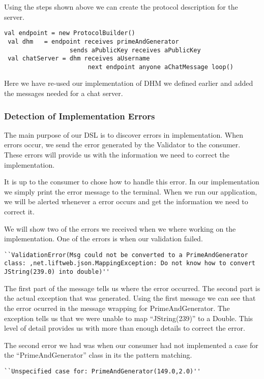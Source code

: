 Using the steps shown above we can create the protocol description for the server. 
\begin{lstlisting}[style=myScalastyle]
 val endpoint = new ProtocolBuilder()
 val dhm   = endpoint receives primeAndGenerator 
                  sends aPublicKey receives aPublicKey
 val chatServer = dhm receives aUsername 
                       next endpoint anyone aChatMessage loop()
\end{lstlisting}
Here we have re-used our implementation of DHM we defined earlier and added the messages needed for a chat server.

\subsubsection{Detection of Implementation Errors}
The main purpose of our DSL is to discover errors in implementation. When errors occur, we send the error generated by the Validator to the consumer. These errors will provide us with the information  we need to correct the implementation. 

It is up to the consumer to chose how to handle this error. In our implementation we simply print the error message to the terminal. When we run our application, we will be alerted whenever a error occurs and get the information we need to correct it.

We will show two of the errors we received when we where working on the implementation. One of the errors is when our validation failed. 
\begin{lstlisting}[style=myScalastyle]
  ``ValidationError(Msg could not be converted to a PrimeAndGenerator class: ,net.liftweb.json.MappingException: Do not know how to convert JString(239.0) into double)''
\end{lstlisting}
The first part of the message tells us where the error occurred. The second part is the actual exception that was generated. Using the first message we can see that the error ocurred in the message wrapping for PrimeAndGenerator. The exception tells us that we were unable to map ``JString(239)'' to a Double. This level of detail provides us with more than enough details to correct the error.

The second error we had was when our consumer had not implemented a case for the ``PrimeAndGenerator'' class in its the pattern matching.
\begin{lstlisting}[style=myScalastyle]
  ``Unspecified case for: PrimeAndGenerator(149.0,2.0)''
\end{lstlisting}

